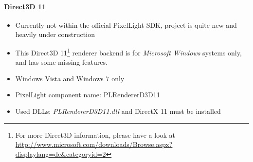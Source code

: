 \paragraph{Direct3D 11}
\begin{itemize}
\item Currently not within the official PixelLight \ac{SDK}, project is quite new and heavily under construction
\item This Direct3D 11\footnote{For more Direct3D information, please have a look at \url{http://www.microsoft.com/downloads/Browse.aspx?displaylang=de&categoryid=2}} renderer backend is for \emph{Microsoft Windows} systems only, and has some missing features.
\item Windows Vista and Windows 7 only
\item PixelLight component name: PLRendererD3D11
\item Used \ac{DLL}s: \emph{PLRendererD3D11.dll} and DirectX 11 must be installed
\end{itemize}
